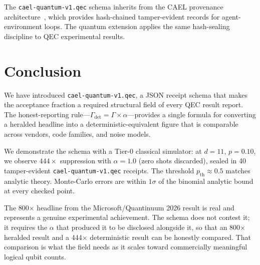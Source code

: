 \documentclass[conference]{IEEEtran}
\newcommand{\pth}{p_{\mathrm{th}}}  %
\newcommand{\af}{\alpha}            %
\newcommand{\suppfactor}{\Gamma}    %
\begin{document}
The \texttt{cael-quantum-v1.qec} schema inherits from the CAEL provenance
architecture~\cite{cael-aamas2026}, which provides hash-chained
tamper-evident records for agent-environment loops. The quantum extension
applies the same hash-sealing discipline to QEC experimental results.

\section{Conclusion}
\label{sec:conclusion}

We have introduced \texttt{cael-quantum-v1.qec}, a JSON receipt schema
that makes the acceptance fraction a required structural field of every
QEC result report. The honest-reporting rule---$\suppfactor_{\mathrm{det}}
= \suppfactor \times \af$---provides a single formula for converting a
heralded headline into a deterministic-equivalent figure that is
comparable across vendors, code families, and noise models.

We demonstrate the schema with a Tier-0 classical simulator: at $d{=}11$,
$p{=}0.10$, we observe $444\times$ suppression with $\af = 1.0$ (zero
shots discarded), sealed in 40 tamper-evident \texttt{cael-quantum-v1.qec}
receipts. The threshold $\pth \approx 0.5$ matches analytic theory.
Monte-Carlo errors are within $1\sigma$ of the binomial analytic bound
at every checked point.

The 800$\times$ headline from the Microsoft/Quantinuum 2026 result is
real and represents a genuine experimental achievement. The schema does
not contest it; it requires the $\af$ that produced it to be disclosed
alongside it, so that an 800$\times$ heralded result and a 444$\times$
deterministic result can be honestly compared. That comparison is what
the field needs as it scales toward commercially meaningful logical qubit
counts.



\end{document}
